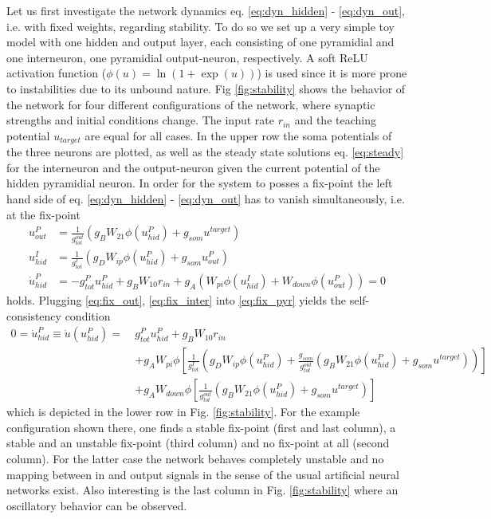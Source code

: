 \documentclass[12pt,a4paper]{article}
\begin{document}
Let us first investigate the network dynamics eq. \eqref{eq:dyn_hidden} - \eqref{eq:dyn_out}, i.e. with fixed weights, regarding stability. To do so we set up a very simple toy model with one hidden and output layer, each consisting of one pyramidial and one interneuron, one pyramidial output-neuron, respectively. A soft ReLU activation function ($\phi(u) = \ln(1 + \exp(u))$) is used since it is more prone to instabilities due to its unbound nature. Fig \ref{fig:stability} shows the behavior of the network for four different configurations of the network, where synaptic strengths and initial conditions change. The input rate $r_{in}$ and the teaching potential $u_{target}$ are equal for all cases. In the upper row the soma potentials of the three neurons are plotted, as well as the steady state solutions eq. \eqref{eq:steady} for the interneuron and the output-neuron given the current potential of the hidden pyramidial neuron.
In order for the system to posses a fix-point the left hand side of eq. \eqref{eq:dyn_hidden} - \eqref{eq:dyn_out} has to vanish simultaneously, i.e. at the fix-point
\begin{align}
u^{P}_{out} &= \frac{1}{g^{out}_{tot}}\left( g_B W_{21}\phi(u^P_{hid}) + g_{som}u^{target}\right) \label{eq:fix_out}\\
u^{I}_{hid} &= \frac{1}{g^{I}_{tot}}\left( g_D W_{ip}\phi(u^P_{hid}) + g_{som}u^{P}_{out}\right) \label{eq:fix_inter}\\
\dot{u}^P_{hid} &= -g^{P}_{tot}u^P_{hid} + g_B W_{10}r_{in} + g_A\left(W_{pi}\phi(u^I_{hid}) + W_{down}\phi(u^P_{out})\right) = 0 \label{eq:fix_pyr}
\end{align}
holds. Plugging \eqref{eq:fix_out}, \eqref{eq:fix_inter} into \eqref{eq:fix_pyr} yields the self-consistency condition
\begin{align}
0 = \dot{u}^P_{hid} \equiv \dot{u}(u^P_{hid}) = ~&g^P_{tot}u^P_{hid} + g_B W_{10}r_{in} \nonumber\\
&+ g_AW_{pi}\phi\left[\frac{1}{g^I_{tot}}\left( g_D W_{ip}\phi(u^P_{hid}) + \frac{g_{som}}{g^{out}_{tot}}\left( g_B W_{21}\phi(u^P_{hid}) + g_{som}u^{target}\right)\right)\right] \nonumber\\
&+ g_AW_{down}\phi\left[\frac{1}{g^{out}_{tot}}\left( g_B W_{21}\phi(u^P_{hid}) + g_{som}u^{target}\right)\right]
\end{align}
which is depicted in the lower row in Fig. \ref{fig:stability}. For the example configuration shown there, one finds a stable fix-point (first and last column), a stable and an unstable fix-point (third column) and no fix-point at all (second column). For the latter case the network behaves completely unstable and no mapping between in and output signals in the sense of the usual artificial neural networks exist. Also interesting is the last column in Fig. \ref{fig:stability} where an oscillatory behavior can be observed.
\end{document}

